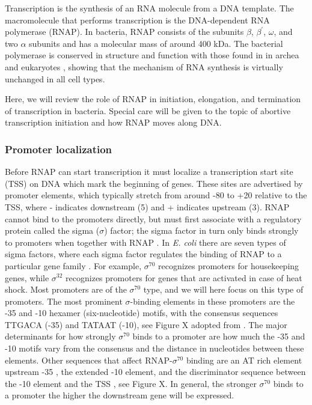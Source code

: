 %
Transcription is the synthesis of an RNA molecule from a DNA template. The
macromolecule that performs transcription is the DNA-dependent RNA polymerase
(RNAP). In bacteria, RNAP consists of the subunits $\beta$, $\beta^{\prime}$,
$\omega$, and two $\alpha$ subunits and has a molecular mass of around 400 kDa.
The bacterial polymerase is conserved in structure and function with those
found in in archea and eukaryotes \cite{borukhov_rna_2008}, showing that the
mechanism of RNA synthesis is virtually unchanged in all cell types.

Here, we will review the role of RNAP in initiation, elongation, and
termination of transcription in bacteria. Special care will be given to the
topic of abortive transcription initiation and how RNAP moves along DNA.

\subsubsection{Promoter localization}
Before RNAP can start transcription it must localize a transcription start site
(TSS) on DNA which mark the beginning of genes. These sites are advertised by
promoter elements, which typically stretch from around -80 to +20 relative to
the TSS, where - indicates downstream (5\p) and + indicates upstream (3\p).
RNAP cannot bind to the promoters directly, but must first associate with a
regulatory protein called the sigma ($\sigma$) factor; the sigma factor in turn
only binds strongly to promoters when together with RNAP \cite{paget_70_2003}.
In \textit{E. coli} there are seven types of sigma factors, where each sigma
factor regulates the binding of RNAP to a particular gene family
\cite{osterberg_regulation_2011}. For example, $\sigma^{70}$ recognizes
promoters for housekeeping genes, while $\sigma^{32}$ recognizes promoters for
genes that are activated in case of heat shock. Most promoters are of the
$\sigma^{70}$ type, and we will here focus on this type of promoters. The most
prominent $\sigma$-binding elements in these promoters are the -35 and -10
hexamer (six-nucleotide) motifs, with the consensus sequences TTGACA (-35) and
TATAAT (-10), see Figure X adopted from \cite{haugen_fine_2008}. The major
determinants for how strongly $\sigma^{70}$ binds to a promoter are how much
the -35 and -10 motifs vary from the consensus and the distance in nucleotides
between these elements. Other sequences that affect RNAP-$\sigma^{70}$ binding
are an AT rich element upstream -35 \cite{ross_third_1993}, the extended -10
element, and the discriminator sequence between the -10 element and the TSS
\cite{haugen_fine_2008}, see Figure X. In general, the stronger $\sigma^{70}$
binds to a promoter the higher the downstream gene will be expressed.

